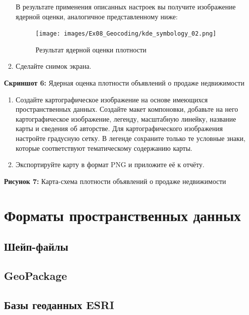 \documentclass[
  12pt,
]{book}
\begin{document}
\begin{enumerate}
  В результате применения описанных настроек вы получите изображение ядерной оценки, аналогичное представленному ниже:

  \begin{figure}
  \centering
  \texttt{[image: images/Ex08\_Geocoding/kde\_symbology\_02.png]}
  \caption{Результат ядерной оценки плотности}
  \end{figure}
\item
  Сделайте снимок экрана.
\end{enumerate}

\textbf{Скриншот 6:} Ядерная оценка плотности объявлений о продаже недвижимости

\begin{enumerate}
\def\labelenumi{\arabic{enumi}.}
\setcounter{enumi}{11}
\item
  Создайте картографическое изображение на основе имеющихся пространственных данных. Создайте макет компоновки, добавьте на него картографическое изображение, легенду, масштабную линейку, название карты и сведения об авторстве. Для картографического изображения настройте градусную сетку. В легенде сохраните только те условные знаки, которые соответствуют тематическому содержанию карты.
\item
  Экспортируйте карту в формат PNG и приложите её к отчёту.
\end{enumerate}

\textbf{Рисунок 7:} Карта-схема плотности объявлений о продаже недвижимости

\hypertarget{appendix-ux441ux43fux440ux430ux432ux43eux447ux43dux44bux435-ux441ux432ux435ux434ux435ux43dux438ux44f}{%
\appendix}


\hypertarget{manual-catalog}{%
\chapter{Форматы пространственных данных}\label{manual-catalog}}

\hypertarget{manual-dataformats-shapefile}{%
\section{Шейп-файлы}\label{manual-dataformats-shapefile}}

\hypertarget{geopackage}{%
\section{GeoPackage}\label{geopackage}}

\hypertarget{ux431ux430ux437ux44b-ux433ux435ux43eux434ux430ux43dux43dux44bux445-esri}{%
\section{Базы геоданных ESRI}\label{ux431ux430ux437ux44b-ux433ux435ux43eux434ux430ux43dux43dux44bux445-esri}}
\end{document}
